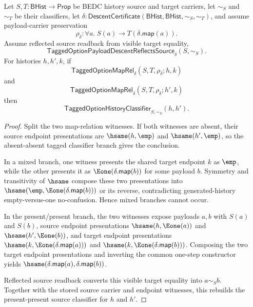 \begin{theorem}
\label{thm:tagged-option-maprel-common-target-source-classification}
Let $S,T:\mathsf{BHist}\to\mathsf{Prop}$ be BEDC history source and target
carriers, let $\sim_S$ and $\sim_T$ be their classifiers, let
$\delta:\mathsf{DescentCertificate}(\mathsf{BHist},\mathsf{BHist},\sim_S,\sim_T)$,
and assume payload-carrier preservation
$$
\rho_{\delta}:\forall a.\;S(a)\to T(\delta.\mathsf{map}(a)).
$$
Assume reflected source readback from visible target equality,
$$
\mathsf{TaggedOptionPayloadDescentReflectsSource}_{\delta}(S,\sim_S).
$$
For histories $h,h',k$, if
$$
\mathsf{TaggedOptionMapRel}_{\delta}(S,T,\rho_{\delta};h,k)
$$
and
$$
\mathsf{TaggedOptionMapRel}_{\delta}(S,T,\rho_{\delta};h',k)
$$
then
$$
\mathsf{TaggedOptionHistoryClassifier}_{S,\sim_S}(h,h').
$$
\end{theorem}
\begin{proof}
Split the two map-relation witnesses. If both witnesses are absent, their
source endpoint presentations are $\hsame(h,\emp)$ and
$\hsame(h',\emp)$, so the absent-absent tagged classifier branch gives the
conclusion.

In a mixed branch, one witness presents the shared target endpoint $k$ as
$\emp$, while the other presents it as $\Eone(\delta.\mathsf{map}(b))$ for
some payload $b$. Symmetry and transitivity of $\hsame$ compose these two
presentations into $\hsame(\emp,\Eone(\delta.\mathsf{map}(b)))$ or its reverse,
contradicting generated-history empty-versus-one no-confusion. Hence mixed
branches cannot occur.

In the present/present branch, the two witnesses expose payloads $a,b$ with
$S(a)$ and $S(b)$, source endpoint presentations $\hsame(h,\Eone(a))$ and
$\hsame(h',\Eone(b))$, and target endpoint presentations
$\hsame(k,\Eone(\delta.\mathsf{map}(a)))$ and
$\hsame(k,\Eone(\delta.\mathsf{map}(b)))$. Composing the two target endpoint
presentations and inverting the common one-step constructor yields
$\hsame(\delta.\mathsf{map}(a),\delta.\mathsf{map}(b))$.

Reflected source readback converts this visible target equality into
$a\sim_S b$. Together with the stored source carrier and endpoint witnesses,
this rebuilds the present-present source classifier for $h$ and $h'$.
\end{proof}


